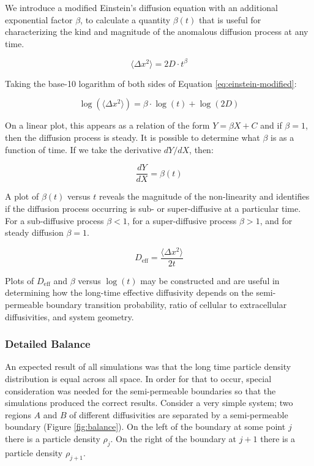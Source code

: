 	
	We introduce a modified Einstein's diffusion equation with an additional exponential factor $ \beta $, to calculate a quantity $ \beta (t) $ that is useful for characterizing the kind and magnitude of the anomalous diffusion process at any time.
	
	\begin{equation}
	\label{eq:einstein-modified}
		\langle \Delta x^2 \rangle = 2D \cdot t^{\beta}
	\end{equation}
	
	\noindent Taking the base-10 logarithm of both sides of Equation \ref{eq:einstein-modified}:

	\begin{equation}
		\log\left( \langle \Delta x^2 \rangle \right) = \beta \cdot \log(t) + \log(2D)
	\end{equation}	
	
	On a linear plot, this appears as a relation of the form $ Y = \beta X + C $ and if $ \beta = 1 $, then the diffusion process is steady. It is possible to determine what $ \beta $ is as a function of time. If we take the derivative $ dY/dX $, then:
	
	\begin{equation}
		\dfrac{dY}{dX} = \beta (t)
	\end{equation}
	
	A plot of $ \beta (t) $ versus $ t $ reveals the magnitude of the non-linearity and identifies if the diffusion process occurring is sub- or super-diffusive at a particular time. For a sub-diffusive process $ \beta < 1 $, for a super-diffusive process $ \beta > 1 $, and for steady diffusion $ \beta = 1 $.
	
	\begin{equation}
		D_\textrm{eff} = \dfrac{\langle \Delta x^2 \rangle}{2t}
	\end{equation}
	
	Plots of $ D_\textrm{eff} $ and $ \beta $ versus $ \log (t) $ may be constructed and are useful in determining how the long-time effective diffusivity depends on the semi-permeable boundary transition probability, ratio of cellular to extracellular diffusivities, and system geometry.
	
\subsubsection{Detailed Balance}

	An expected result of all simulations was that the long time particle density distribution is equal across all space. In order for that to occur, special consideration was needed for the semi-permeable boundaries so that the simulations produced the correct results. Consider a very simple system; two regions $ A $ and $ B $ of different diffusivities are separated by a semi-permeable boundary (Figure \ref{fig:balance}). On the left of the boundary at some point $ j $ there is a particle density $ \rho_j $. On the right of the boundary at $ j+1 $ there is a particle density $ \rho_{j+1} $. 
	
